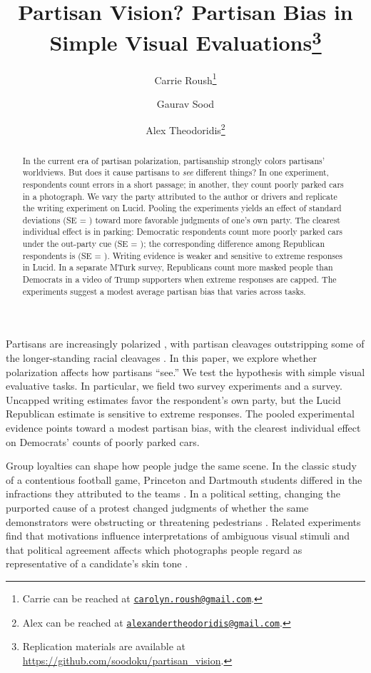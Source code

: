 \documentclass[12pt, letterpaper]{article}
\title{Partisan Vision? Partisan Bias in Simple Visual Evaluations\thanks{Replication materials are available at \url{https://github.com/soodoku/partisan_vision}.}}
\author{Carrie Roush\thanks{Carrie can be reached at \href{mailto:carolyn.roush@gmail.com}{\texttt{carolyn.roush@gmail.com}}.} \and
Gaurav Sood \and
Alex Theodoridis\thanks{Alex can be reached at \href{mailto:alexandertheodoridis@gmail.com}{\texttt{alexandertheodoridis@gmail.com}}.}}
\begin{document}
\maketitle
\thispagestyle{empty}

\begin{abstract}

\noindent In the current era of partisan polarization, partisanship strongly colors partisans' worldviews. But does it cause partisans to \textit{see} different things? In one experiment, respondents count errors in a short passage; in another, they count poorly parked cars in a photograph. We vary the party attributed to the author or drivers and replicate the writing experiment on Lucid. Pooling the experiments yields an effect of \PooledExperimentsAllpartisansEstimate{} standard deviations (SE = \PooledExperimentsAllpartisansSe{}) toward more favorable judgments of one's own party. The clearest individual effect is in parking: Democratic respondents count \CCESParkingDemocratDifference{} more poorly parked cars under the out-party cue (SE = \CCESParkingDemocratDifferenceSe{}); the corresponding difference among Republican respondents is \CCESParkingRepublicanDifference{} (SE = \CCESParkingRepublicanDifferenceSe{}). Writing evidence is weaker and sensitive to extreme responses in Lucid. In a separate MTurk survey, Republicans count more masked people than Democrats in a video of Trump supporters when extreme responses are capped. The experiments suggest a modest average partisan bias that varies across tasks.
\end{abstract}

\newpage

\doublespacing

Partisans are increasingly polarized \citep{IyengarSoodLelkes2012}, with partisan cleavages outstripping some of the longer-standing racial cleavages \citep{IyengarWestwood2015}. In this paper, we explore whether polarization affects how partisans ``see.'' We test the hypothesis with simple visual evaluative tasks. In particular, we field two survey experiments and a survey. Uncapped writing estimates favor the respondent's own party, but the Lucid Republican estimate is sensitive to extreme responses. The pooled experimental evidence points toward a modest partisan bias, with the clearest individual effect on Democrats' counts of poorly parked cars.


Group loyalties can shape how people judge the same scene. In the classic study of a contentious football game, Princeton and Dartmouth students differed in the infractions they attributed to the teams \citep{HastorfCantril1954}. In a political setting, changing the purported cause of a protest changed judgments of whether the same demonstrators were obstructing or threatening pedestrians \citep{KahanEtAl2012}. Related experiments find that motivations influence interpretations of ambiguous visual stimuli \citep{BalcetisDunning2006} and that political agreement affects which photographs people regard as representative of a candidate's skin tone \citep{CarusoEtAl2009}.
\end{document}
